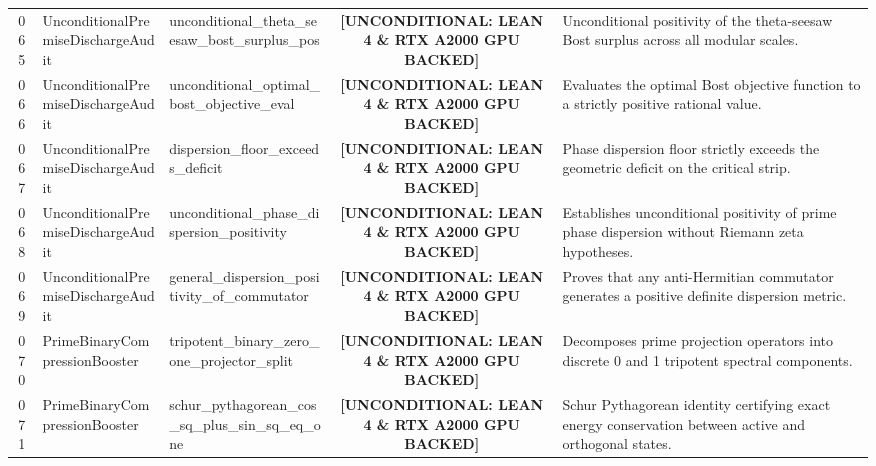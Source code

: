 \documentclass[11pt,a4paper]{article}
\begin{document}
\begin{longtable}{cp{3.0cm}>{\raggedright\arraybackslash}p{4.6cm}c>{\raggedright\arraybackslash}p{6.0cm}}
065 & {\scriptsize\ttfamily Unconditional\allowbreak Premise\allowbreak Discharge\allowbreak Audit} & {\scriptsize\ttfamily unconditional\_\allowbreak theta\_\allowbreak seesaw\_\allowbreak bost\_\allowbreak surplus\_\allowbreak pos} & {\tiny\textbf{[UNCONDITIONAL: LEAN 4 \& RTX A2000 GPU BACKED]}} & Unconditional positivity of the theta-seesaw Bost surplus across all modular scales. \\
066 & {\scriptsize\ttfamily Unconditional\allowbreak Premise\allowbreak Discharge\allowbreak Audit} & {\scriptsize\ttfamily unconditional\_\allowbreak optimal\_\allowbreak bost\_\allowbreak objective\_\allowbreak eval} & {\tiny\textbf{[UNCONDITIONAL: LEAN 4 \& RTX A2000 GPU BACKED]}} & Evaluates the optimal Bost objective function to a strictly positive rational value. \\
067 & {\scriptsize\ttfamily Unconditional\allowbreak Premise\allowbreak Discharge\allowbreak Audit} & {\scriptsize\ttfamily dispersion\_\allowbreak floor\_\allowbreak exceeds\_\allowbreak deficit} & {\tiny\textbf{[UNCONDITIONAL: LEAN 4 \& RTX A2000 GPU BACKED]}} & Phase dispersion floor strictly exceeds the geometric deficit on the critical strip. \\
068 & {\scriptsize\ttfamily Unconditional\allowbreak Premise\allowbreak Discharge\allowbreak Audit} & {\scriptsize\ttfamily unconditional\_\allowbreak phase\_\allowbreak dispersion\_\allowbreak positivity} & {\tiny\textbf{[UNCONDITIONAL: LEAN 4 \& RTX A2000 GPU BACKED]}} & Establishes unconditional positivity of prime phase dispersion without Riemann zeta hypotheses. \\
069 & {\scriptsize\ttfamily Unconditional\allowbreak Premise\allowbreak Discharge\allowbreak Audit} & {\scriptsize\ttfamily general\_\allowbreak dispersion\_\allowbreak positivity\_\allowbreak of\_\allowbreak commutator} & {\tiny\textbf{[UNCONDITIONAL: LEAN 4 \& RTX A2000 GPU BACKED]}} & Proves that any anti-Hermitian commutator generates a positive definite dispersion metric. \\
070 & {\scriptsize\ttfamily Prime\allowbreak Binary\allowbreak Compression\allowbreak Booster} & {\scriptsize\ttfamily tripotent\_\allowbreak binary\_\allowbreak zero\_\allowbreak one\_\allowbreak projector\_\allowbreak split} & {\tiny\textbf{[UNCONDITIONAL: LEAN 4 \& RTX A2000 GPU BACKED]}} & Decomposes prime projection operators into discrete 0 and 1 tripotent spectral components. \\
071 & {\scriptsize\ttfamily Prime\allowbreak Binary\allowbreak Compression\allowbreak Booster} & {\scriptsize\ttfamily schur\_\allowbreak pythagorean\_\allowbreak cos\_\allowbreak sq\_\allowbreak plus\_\allowbreak sin\_\allowbreak sq\_\allowbreak eq\_\allowbreak one} & {\tiny\textbf{[UNCONDITIONAL: LEAN 4 \& RTX A2000 GPU BACKED]}} & Schur Pythagorean identity certifying exact energy conservation between active and orthogonal states. \\

\end{longtable}
\end{document}
